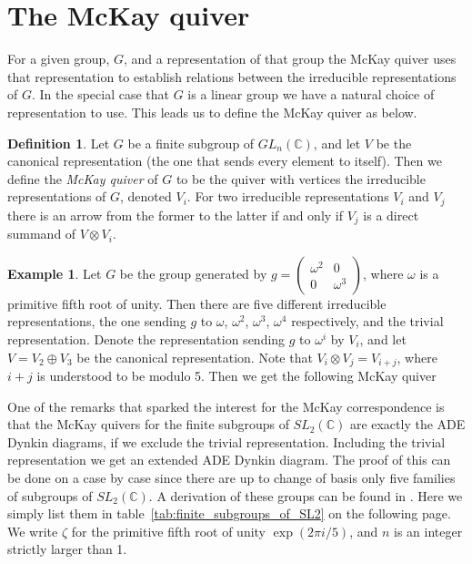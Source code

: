 \documentclass[11pt, a4paper, english]{article}
\theoremstyle{definition}
\newtheorem{defin}[theorem]{Definition}
\newtheorem{example}[theorem]{Example}
\newcommand{\C}{\mathbb{C}}
\begin{document}
\section{The McKay quiver}
For a given group, $G$, and a representation of that group the McKay quiver uses that representation to establish relations between the irreducible representations of $G$. In the special case that $G$ is a linear group we have a natural choice of representation to use. This leads us to define the McKay quiver as below.
\begin{defin}
Let $G$ be a finite subgroup of $GL_n(\C)$, and let $V$ be the canonical representation (the one that sends every element to itself). Then we define the \textit{McKay quiver} of $G$ to be the quiver with vertices the irreducible representations of $G$, denoted $V_i$. For two irreducible representations $V_i$ and $V_j$ there is an arrow from the former to the latter if and only if $V_j$ is a direct summand of $V \otimes V_i$.
\end{defin}

\begin{example}
Let $G$ be the group generated by $g =\begin{pmatrix}
\omega^2 & 0\\
0 & \omega^{3}
\end{pmatrix}$, where $\omega$ is a primitive fifth root of unity. Then there are five different irreducible representations, the one sending $g$ to $\omega$, $\omega^2$, $\omega^3$, $\omega^4$ respectively, and the trivial representation. Denote the representation sending $g$ to $\omega^i$ by $V_i$, and let $V = V_2 \oplus V_3$ be the canonical representation. Note that $V_i \otimes V_j = V_{i+j}$, where $i+j$ is understood to be modulo 5. Then we get the following McKay quiver

\begin{center}
\end{center}

\end{example}

One of the remarks that sparked the interest for the McKay correspondence is that the McKay quivers for the finite subgroups of $SL_2(\C)$ are exactly the ADE Dynkin diagrams, if we exclude the trivial representation. Including the trivial representation we get an extended ADE Dynkin diagram. The proof of this can be done on a case by case since there are up to change of basis only five families of subgroups of $SL_2(\C)$. A derivation of these groups can be found in \cite{Carrasco}. Here we simply list them in table~\ref{tab:finite_subgroups_of_SL2} on the following page. We write $\zeta$ for the primitive fifth root of unity $\exp(2\pi i/5)$, and $n$ is an integer strictly larger than 1.
\end{document}
